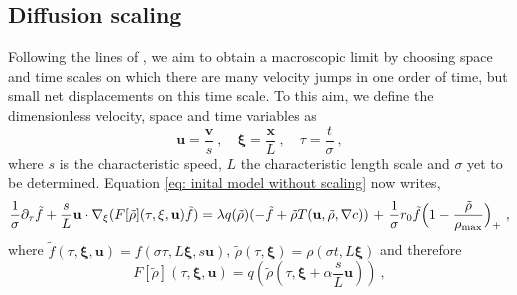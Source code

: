 \documentclass{aims} %
\theoremstyle{definition}
\begin{document}
\subsection{Diffusion scaling} Following the lines of \cite{Hillen2009}, we aim to obtain a macroscopic limit by choosing space and time scales on which {there are many velocity jumps in one order of time, but small net displacements on this time scale}. To this aim, we define the dimensionless velocity, space and time variables as
\begin{equation}
\mathbf{u} = \frac{\mathbf{v}}{s}\ , \quad \mathbf{\xi} = \frac{\mathbf{x}}{L}\ , \quad \tau = \frac{t}{\sigma}\ , \nonumber
\end{equation}
\noindent where $s$ is the characteristic speed, $L$ the characteristic length scale and $\sigma$ yet to be determined. Equation \eqref{eq: inital model without scaling} now writes,
\begin{equation}
    {{\frac{1}{\sigma}}} \partial_\tau \tilde{f}+ \frac{s}{L} \mathbf{u} \cdot \nabla_\xi (F[\tilde{\rho}](\tau,\mathbf{\xi},\mathbf{u}) \tilde{f})= \lambda q(\tilde{\rho})(-\tilde{f}+\tilde{\rho} T(\mathbf{u},\tilde{\rho},\nabla c)){\ +\ \frac{1}{\sigma} r_0\tilde{f}\Bigl(1-\frac{\tilde{\rho}}{\rho_{\textnormal{max}}} \Bigr)_+}\ ,\label{eq: scaled model}
\end{equation}
\noindent where {{$\tilde{f}(\tau,\mathbf{\xi},\mathbf{u}) = f(\sigma \tau,L \mathbf{\xi} ,s \mathbf{u})$}}, $\tilde{\rho}(\tau,\mathbf{\xi}) = \rho(\sigma t,L \mathbf{\xi})$ and therefore 
\begin{equation}
F[\tilde{\rho}](\tau,\mathbf{\xi},\mathbf{u}) = {{q(\tilde{\rho}(\tau, \mathbf{\xi} + \alpha \frac{s}{L} \mathbf{u}))}}\ , \nonumber
\end{equation}
\end{document}

